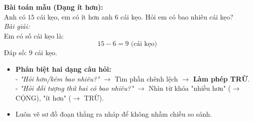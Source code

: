 \documentclass[11pt,a4paper]{article}
\begin{document}
\vspace{-1.5mm}
\noindent
\begin{minipage}[t]{0.49\textwidth}\vspace{0pt}
\begin{tcolorbox}[
  enhanced,
  colback=green!4!white,
  colframe=green!60!black,
  arc=2mm, boxrule=0.8pt,
  left=2mm, right=2mm, top=1.8mm, bottom=1.8mm,
  title={\footnotesize\bfseries\color{white}\faCheckCircle\ 4. Ví dụ thực hành chuẩn mực}
]
{\footnotesize
\textbf{Bài toán mẫu (Dạng ít hơn):}\\
Anh có $15$ cái kẹo, em có ít hơn anh $6$ cái kẹo. Hỏi em có bao nhiêu cái kẹo?\\
\textit{Bài giải:}\\
Em có số cái kẹo là:
$$15 - 6 = 9\text{ (cái kẹo)}$$
Đáp số: $9$ cái kẹo.
}
\end{tcolorbox}
\end{minipage}
\hfill
\begin{minipage}[t]{0.49\textwidth}\vspace{0pt}
\begin{tcolorbox}[
  enhanced,
  colback=red!4!white,
  colframe=red!75!black,
  arc=2mm, boxrule=0.8pt,
  left=2mm, right=2mm, top=1.8mm, bottom=1.8mm,
  title={\footnotesize\bfseries\color{white}\faExclamationTriangle\ 5. Mẹo tránh bẫy trắc nghiệm}
]
{\footnotesize
\begin{itemize}\setlength{\itemsep}{1pt}\setlength{\leftskip}{-2.5mm}
  \item \textbf{Phân biệt hai dạng câu hỏi:}\\
  - \textit{"Hỏi hơn/kém bao nhiêu?"} $\to$ Tìm phần chênh lệch $\to$ \textbf{Làm phép TRỪ}.\\
  - \textit{"Hỏi đối tượng thứ hai có bao nhiêu?"} $\to$ Nhìn từ khóa "nhiều hơn" ($\to$ CỘNG), "ít hơn" ($\to$ TRỪ).
  \item Luôn vẽ sơ đồ đoạn thẳng ra nháp để không nhầm chiều so sánh.
\end{itemize}
}
\end{tcolorbox}
\end{minipage}
\end{document}
